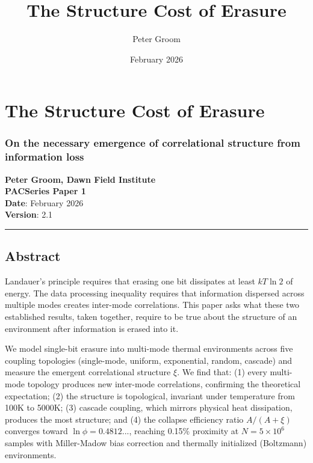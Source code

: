 \documentclass[
  11pt,
  a4paper]{article}
\title{The Structure Cost of Erasure}
\author{Peter Groom}
\date{February 2026}
\begin{document}
\maketitle

\renewcommand*\contentsname{Contents}
{
\setcounter{tocdepth}{3}
\tableofcontents
}
\section{The Structure Cost of
Erasure}\label{the-structure-cost-of-erasure}

\subsubsection{On the necessary emergence of correlational structure
from information
loss}\label{on-the-necessary-emergence-of-correlational-structure-from-information-loss}

\textbf{Peter Groom, Dawn Field Institute}\\
\textbf{PACSeries Paper 1}\\
\textbf{Date}: February 2026\\
\textbf{Version}: 2.1

\begin{center}\rule{0.5\linewidth}{0.5pt}\end{center}

\subsection{Abstract}\label{abstract}

Landauer's principle requires that erasing one bit dissipates at least
\(kT \ln 2\) of energy. The data processing inequality requires that
information dispersed across multiple modes creates inter-mode
correlations. This paper asks what these two established results, taken
together, require to be true about the structure of an environment after
information is erased into it.

We model single-bit erasure into multi-mode thermal environments across
five coupling topologies (single-mode, uniform, exponential, random,
cascade) and measure the emergent correlational structure \(\xi\). We
find that: (1) every multi-mode topology produces new inter-mode
correlations, confirming the theoretical expectation; (2) the structure
is topological, invariant under temperature from 100K to 5000K; (3)
cascade coupling, which mirrors physical heat dissipation, produces the
most structure; and (4) the collapse efficiency ratio \(A/(A+\xi)\)
converges toward \(\ln\phi = 0.4812...\), reaching 0.15\% proximity at
\(N = 5 \times 10^6\) samples with Miller-Madow bias correction and
thermally initialized (Boltzmann) environments.
\end{document}

